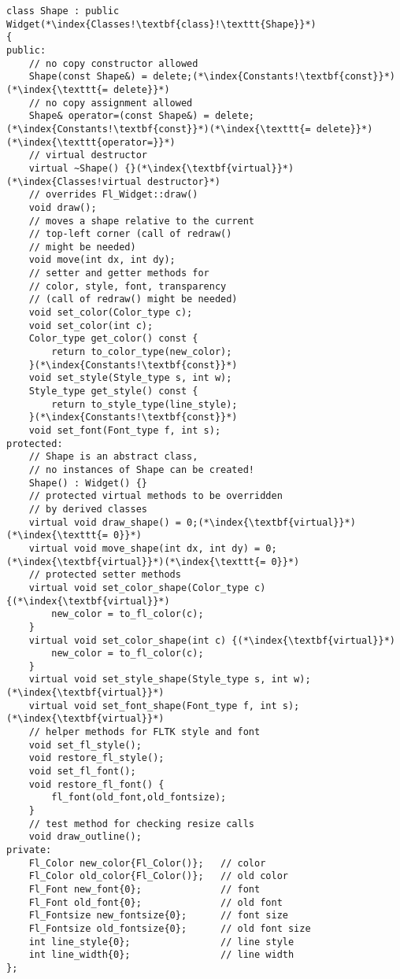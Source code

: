 \documentclass[10pt]{book}
\begin{document}
\begin{lstlisting}
class Shape : public Widget(*\index{Classes!\textbf{class}!\texttt{Shape}}*)
{
public:
    // no copy constructor allowed
    Shape(const Shape&) = delete;(*\index{Constants!\textbf{const}}*)(*\index{\texttt{= delete}}*)
    // no copy assignment allowed
    Shape& operator=(const Shape&) = delete;(*\index{Constants!\textbf{const}}*)(*\index{\texttt{= delete}}*)(*\index{\texttt{operator=}}*)
    // virtual destructor
    virtual ~Shape() {}(*\index{\textbf{virtual}}*)(*\index{Classes!virtual destructor}*)
    // overrides Fl_Widget::draw()
    void draw();
    // moves a shape relative to the current
    // top-left corner (call of redraw()
    // might be needed)
    void move(int dx, int dy);
    // setter and getter methods for
    // color, style, font, transparency
    // (call of redraw() might be needed)
    void set_color(Color_type c);
    void set_color(int c);
    Color_type get_color() const {
        return to_color_type(new_color);
    }(*\index{Constants!\textbf{const}}*)
    void set_style(Style_type s, int w);
    Style_type get_style() const {
        return to_style_type(line_style);
    }(*\index{Constants!\textbf{const}}*)
    void set_font(Font_type f, int s);
protected:
    // Shape is an abstract class,
    // no instances of Shape can be created!
    Shape() : Widget() {}
    // protected virtual methods to be overridden
    // by derived classes
    virtual void draw_shape() = 0;(*\index{\textbf{virtual}}*)(*\index{\texttt{= 0}}*)
    virtual void move_shape(int dx, int dy) = 0;(*\index{\textbf{virtual}}*)(*\index{\texttt{= 0}}*)
    // protected setter methods
    virtual void set_color_shape(Color_type c) {(*\index{\textbf{virtual}}*)
        new_color = to_fl_color(c);
    }
    virtual void set_color_shape(int c) {(*\index{\textbf{virtual}}*)
        new_color = to_fl_color(c);
    }
    virtual void set_style_shape(Style_type s, int w);(*\index{\textbf{virtual}}*)
    virtual void set_font_shape(Font_type f, int s);(*\index{\textbf{virtual}}*)
    // helper methods for FLTK style and font
    void set_fl_style();
    void restore_fl_style();
    void set_fl_font();
    void restore_fl_font() {
        fl_font(old_font,old_fontsize);
    }
    // test method for checking resize calls
    void draw_outline();
private:
    Fl_Color new_color{Fl_Color()};   // color
    Fl_Color old_color{Fl_Color()};   // old color
    Fl_Font new_font{0};              // font
    Fl_Font old_font{0};              // old font
    Fl_Fontsize new_fontsize{0};      // font size
    Fl_Fontsize old_fontsize{0};      // old font size
    int line_style{0};                // line style
    int line_width{0};                // line width
};
\end{lstlisting}
\end{document}

